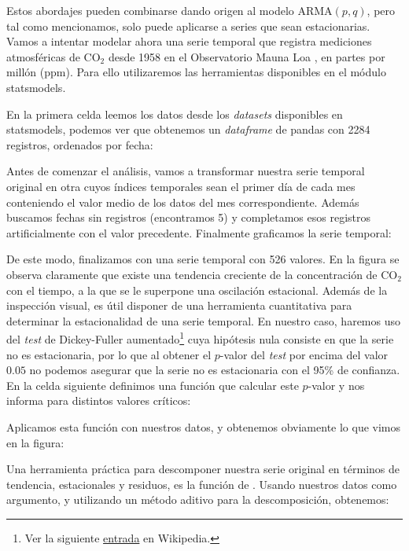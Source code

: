 Estos abordajes pueden combinarse dando origen al modelo ARMA$(p, q)$, pero tal como mencionamos, solo puede aplicarse a series que sean estacionarias. Vamos a intentar modelar ahora una serie temporal que registra mediciones atmosféricas de CO$_2$ desde 1958 en el Observatorio Mauna Loa \cite{keeling2005}, en partes por millón (ppm). Para ello utilizaremos las herramientas disponibles en el módulo statsmodels.

En la primera celda leemos los datos desde los \textit{datasets} disponibles en statsmodels, podemos ver que obtenemos un \textit{dataframe} de pandas con 2284 registros, ordenados por fecha:

Antes de comenzar el análisis, vamos a transformar nuestra serie temporal original en otra cuyos índices temporales sean el primer día de cada mes conteniendo el valor medio de los datos del mes correspondiente. Además buscamos fechas sin registros (encontramos 5) y completamos esos registros artificialmente con el valor precedente. Finalmente graficamos la serie temporal:

De este modo, finalizamos con una serie temporal con 526 valores. En la figura se observa claramente que existe una tendencia creciente de la concentración de CO$_2$ con el tiempo, a la que se le superpone una oscilación estacional. Además de la inspección visual, es útil disponer de una herramienta cuantitativa para determinar la estacionalidad de una serie temporal. En nuestro caso, haremos uso del \textit{test} de Dickey-Fuller aumentado\footnote{Ver la siguiente \href{https://es.wikipedia.org/wiki/Prueba_de_Dickey-Fuller_aumentada}{entrada} en Wikipedia.} cuya hipótesis nula consiste en que la serie no es estacionaria, por lo que al obtener el $p$-valor del \textit{test} por encima del valor $0.05$ no podemos asegurar que la serie no es estacionaria con el 95\% de confianza. En la celda siguiente definimos una función que calcular este $p$-valor y nos informa para distintos valores críticos:

Aplicamos esta función con nuestros datos, y obtenemos obviamente lo que vimos en la figura:

Una herramienta práctica para descomponer nuestra serie original en términos de tendencia, estacionales y residuos, es la función  de . Usando nuestros datos  como argumento, y utilizando un método aditivo para la descomposición, obtenemos:

